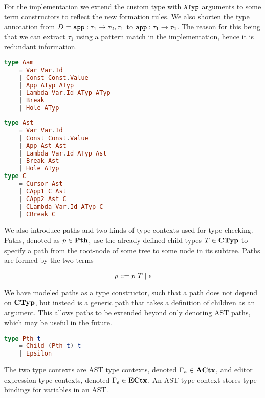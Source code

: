For the implementation we extend the custom type with $\texttt{ATyp}$ arguments to
some term constructors to reflect the new formation rules. We also shorten the
type annotation from $D = \texttt{app} : \tau_1\to\tau_2,\tau_1$ to
$\texttt{app} : \tau_1\to\tau_2$. The reason for this being that we can extract
$\tau_1$ using a pattern match in the implementation, hence it is redundant
information.

\begin{lstlisting}[language=elm,%
    gobble=0,%
    caption={Formation rules (\ref{eq:lan-mod-aam}) modeled in Elm}%
    ]
type Aam
    = Var Var.Id
    | Const Const.Value
    | App ATyp ATyp
    | Lambda Var.Id ATyp ATyp
    | Break
    | Hole ATyp
\end{lstlisting}
\begin{lstlisting}[language=elm,%
    gobble=0,%
    caption={Formation rules (\ref{eq:lan-mod-ast}) modeled in Elm}%
    ]
type Ast
    = Var Var.Id
    | Const Const.Value
    | App Ast Ast
    | Lambda Var.Id ATyp Ast
    | Break Ast
    | Hole ATyp
type C
    = Cursor Ast
    | CApp1 C Ast
    | CApp2 Ast C
    | CLambda Var.Id ATyp C
    | CBreak C
\end{lstlisting}

We also introduce paths and two kinds of type contexts used for type checking.
Paths, denoted as $p \in \textbf{Pth}$, use the already defined child types $T \in
    \textbf{CTyp}$ to specify a path from the root-node of some tree to some node in its
subtree. Paths are formed by the two terms

\begin{equation}\label{eq:path-formation}
    p ::= p~T \mid \epsilon
\end{equation}

We have modeled paths as a type constructor, such that a path does not depend on
$\textbf{CTyp}$, but instead is a generic path that takes a definition of children as an
argument. This allows paths to be extended beyond only denoting AST paths, which
may be useful in the future.

\begin{lstlisting}[language=elm,%
                   label={pth-type},%
                   gobble=0,%
                   caption={Formation rules (\ref{eq:path-formation}) modeled in Elm},%
                   ]
type Pth t
    = Child (Pth t) t
    | Epsilon
\end{lstlisting}

The two type contexts are AST type contexts, denoted $\Gamma_{a} \in \textbf{ACtx}$, and
editor expression type contexts, denoted $\Gamma_{e} \in \textbf{ECtx}$. An AST type
context stores type bindings for variables in an AST.

